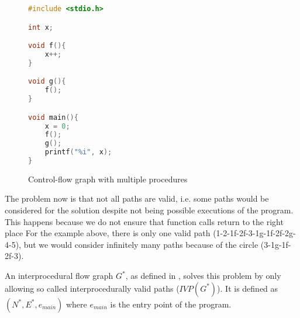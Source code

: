 \begin{figure}[ht]
\begin{minipage}[t]{0.5\textwidth}
\hfill
\begin{lstlisting}[language=C]
#include <stdio.h>

int x;

void f(){
    x++;
}

void g(){
    f();
}

void main(){
    x = 0;
    f();
    g();
    printf("%i", x);
}
\end{lstlisting}
\end{minipage}
\begin{minipage}[t]{0.5\textwidth}
\vspace{0pt}
\centering
{}
\end{minipage}
  \caption{Control-flow graph with multiple procedures}
  \label{fig:ivp}
\end{figure}

The problem now is that not all paths are valid, i.e. some paths would be considered for the solution despite not being possible executions of the program. This happens because we do not ensure that function calls return to the right place
For the example above, there is only one valid path (1-2-1f-2f-3-1g-1f-2f-2g-4-5), but we would consider infinitely many paths because of the circle (3-1g-1f-2f-3).

An interprocedural flow graph $G^*$, as defined in \cite{Sharir:1981:CallStrings}, solves this problem by only allowing so called interprocedurally valid paths ($\mathit{IVP}(G^*)$). It is defined as $(N^*,E^*,e_{main})$ where $e_{main}$ is the entry point of the program.

